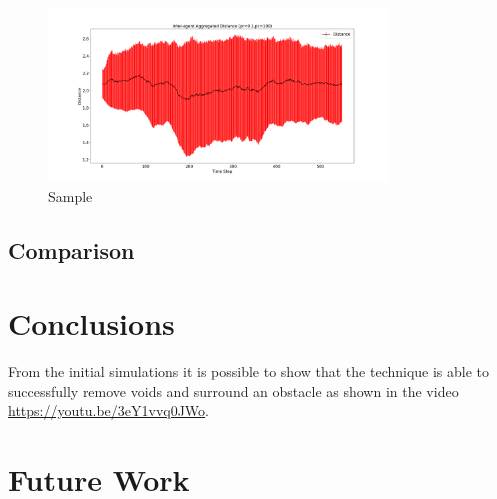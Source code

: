 \documentclass[12pt,a4paper]{IEEEtran}
\begin{document}
\begin{figure}[H]
	\begin{center}
		\includegraphics[width=9cm]{figures/Figure_10}
	\end{center}
	\caption{Sample}
\end{figure}


\subsection{Comparison}

\section{Conclusions}\label{conclusions}
From the initial simulations it is possible to show that the technique is able to successfully remove voids and surround an obstacle as shown in the video \href{https://youtu.be/3eY1vvq0JWo}{https://youtu.be/3eY1vvq0JWo}.

\section{Future Work}



\end{document}
